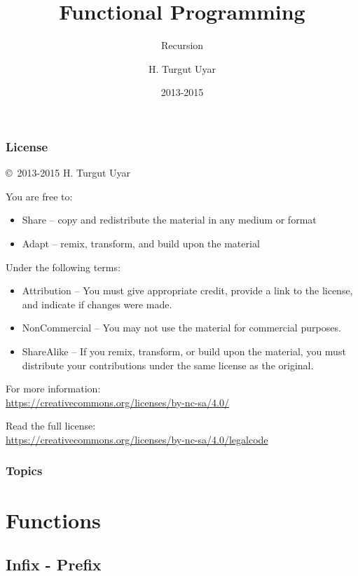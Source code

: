 \documentclass[dvipsnames]{beamer}
\title{Functional Programming}
\subtitle{Recursion}
\author{H. Turgut Uyar}
\date{2013-2015}
\theoremstyle{plain}
\begin{document}
\begin{frame}
  \titlepage
\end{frame}

\begin{frame}
  \frametitle{License}

  \hfill
  \copyright~2013-2015 H. Turgut Uyar

  \vfill
  \begin{footnotesize}
    You are free to:
    \begin{itemize}
      \itemsep0em
      \item Share -- copy and redistribute the material in any medium or format
      \item Adapt -- remix, transform, and build upon the material
    \end{itemize}

    Under the following terms:
    \begin{itemize}
      \itemsep0em
      \item Attribution -- You must give appropriate credit, provide a link to
        the license, and indicate if changes were made.

      \item NonCommercial -- You may not use the material for commercial
        purposes.

      \item ShareAlike -- If you remix, transform, or build upon the material,
        you must distribute your contributions under the same license as the
        original.
    \end{itemize}

    For more information:\\
    \url{https://creativecommons.org/licenses/by-nc-sa/4.0/}

    \smallskip
    Read the full license:\\
    \url{https://creativecommons.org/licenses/by-nc-sa/4.0/legalcode}
  \end{footnotesize}
\end{frame}

\begin{frame}
  \frametitle{Topics}
  \tableofcontents
\end{frame}

\section{Functions}

\subsection{Infix - Prefix}
\end{document}
